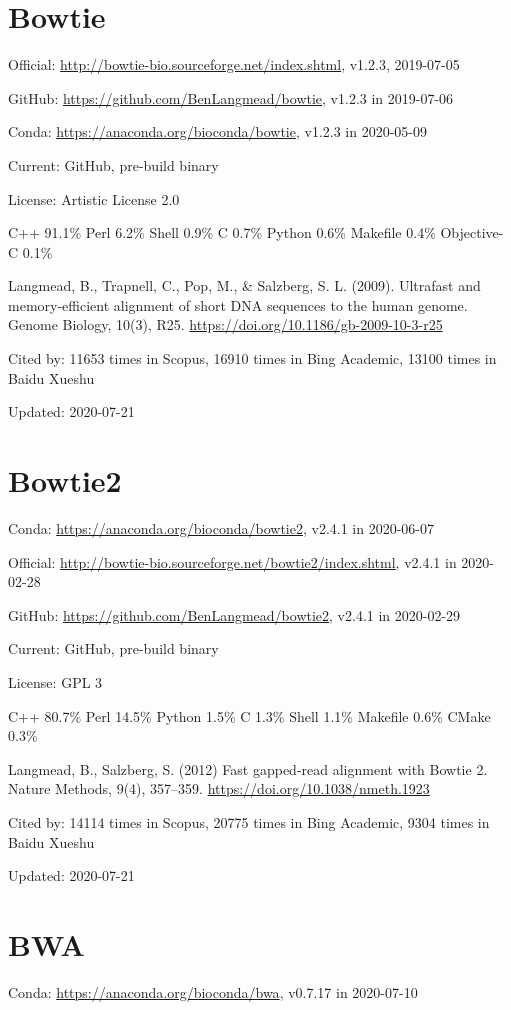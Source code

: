 \documentclass[]{article}
\newcommand{\cb}[3]{\par Cited by: {\color{blue}\Huge #1} times in Scopus, {\color{blue}\Huge #2} times in Bing Academic, {\color{blue}\Huge #3} times in Baidu Xueshu}
\begin{document}
\section{Bowtie}

Official: \url{http://bowtie-bio.sourceforge.net/index.shtml}, v1.2.3, 2019-07-05

GitHub: \url{https://github.com/BenLangmead/bowtie}, v1.2.3 in 2019-07-06

Conda: \url{https://anaconda.org/bioconda/bowtie}, v1.2.3 in 2020-05-09

Current: GitHub, pre-build binary

License: Artistic License 2.0

C++ 91.1\% Perl 6.2\% Shell 0.9\% C 0.7\% Python 0.6\% Makefile 0.4\% Objective-C 0.1\%

Langmead, B., Trapnell, C., Pop, M., \& Salzberg, S. L. (2009). Ultrafast and memory-efficient alignment of short DNA sequences to the human genome. Genome Biology, 10(3), R25. \url{https://doi.org/10.1186/gb-2009-10-3-r25} \cb{11653}{16910}{13100}

Updated: 2020-07-21

\section{Bowtie2}

Conda: \url{https://anaconda.org/bioconda/bowtie2}, v2.4.1 in 2020-06-07

Official: \url{http://bowtie-bio.sourceforge.net/bowtie2/index.shtml}, v2.4.1 in 2020-02-28

GitHub: \url{https://github.com/BenLangmead/bowtie2}, v2.4.1 in 2020-02-29

Current: GitHub, pre-build binary

License: GPL 3

C++ 80.7\% Perl 14.5\% Python 1.5\% C 1.3\% Shell 1.1\% Makefile 0.6\% CMake 0.3\%

Langmead, B., Salzberg, S. (2012) Fast gapped-read alignment with Bowtie 2. Nature Methods, 9(4), 357–359. \url{https://doi.org/10.1038/nmeth.1923}\cb{14114}{20775}{9304}

Updated: 2020-07-21

\section{BWA}

Conda: \url{https://anaconda.org/bioconda/bwa}, v0.7.17 in 2020-07-10
\end{document}
